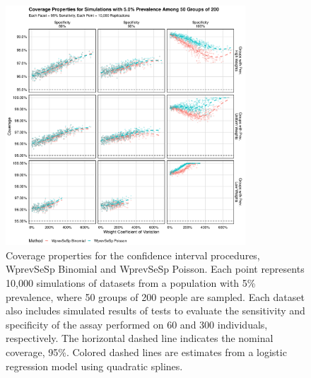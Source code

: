 \begin{figure}
\centering
\includegraphics[width=0.8\textwidth]{imperfect_coverage_50_groups_0_05_prev}
\caption{Coverage properties for the confidence interval procedures, WprevSeSp Binomial and WprevSeSp Poisson.
Each point represents 10,000 simulations of datasets from a population with 5\% prevalence, where 50 groups of 200 people are sampled.
Each dataset also includes simulated results of tests to evaluate the sensitivity and specificity of the assay performed on 60 and 300 individuals, respectively.
The horizontal dashed line indicates the nominal coverage, 95\%.
Colored dashed lines are estimates from a logistic regression model using quadratic splines.}
\label{ch_3:fig:imperfect_coverage_50_groups_0_05_prev}
\end{figure}

